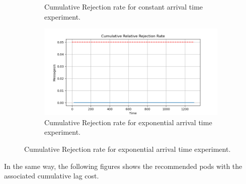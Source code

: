 \begin{figure}[H]
\begin{subfigure}{0.49\linewidth}
	    \caption{Cumulative Rejection rate for constant arrival time experiment.}
	    \label{fig:sliding_window_constant_rejection}
	\end{subfigure}
	\begin{subfigure}{0.49\linewidth}
	    \centering
	    \includegraphics[width=1\linewidth]{images/sliding_window/exponential/rejection_cumulative.png}
	    \caption{Cumulative Rejection rate for exponential arrival time experiment.}
	    \label{fig:sliding_window_exponential_rejection}
	\end{subfigure}
\end{figure}

In the same way, the following figures shows the recommended pods with the associated cumulative lag cost.

